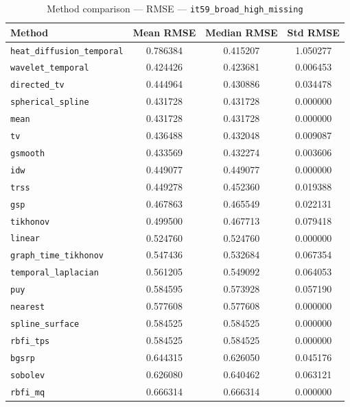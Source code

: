 \begin{table}[ht]
\centering
\caption{Method comparison — RMSE — \texttt{it59_broad_high_missing}}
\label{tab:rmse_it59_broad_high_missing}
\begin{tabular}{lccc}
\hline
Method & Mean RMSE & Median RMSE & Std RMSE \\
\hline
\texttt{heat_diffusion_temporal} & 0.786384 & 0.415207 & 1.050277 \\
\texttt{wavelet_temporal} & 0.424426 & 0.423681 & 0.006453 \\
\texttt{directed_tv} & 0.444964 & 0.430886 & 0.034478 \\
\texttt{spherical_spline} & 0.431728 & 0.431728 & 0.000000 \\
\texttt{mean} & 0.431728 & 0.431728 & 0.000000 \\
\texttt{tv} & 0.436488 & 0.432048 & 0.009087 \\
\texttt{gsmooth} & 0.433569 & 0.432274 & 0.003606 \\
\texttt{idw} & 0.449077 & 0.449077 & 0.000000 \\
\texttt{trss} & 0.449278 & 0.452360 & 0.019388 \\
\texttt{gsp} & 0.467863 & 0.465549 & 0.022131 \\
\texttt{tikhonov} & 0.499500 & 0.467713 & 0.079418 \\
\texttt{linear} & 0.524760 & 0.524760 & 0.000000 \\
\texttt{graph_time_tikhonov} & 0.547436 & 0.532684 & 0.067354 \\
\texttt{temporal_laplacian} & 0.561205 & 0.549092 & 0.064053 \\
\texttt{puy} & 0.584595 & 0.573928 & 0.057190 \\
\texttt{nearest} & 0.577608 & 0.577608 & 0.000000 \\
\texttt{spline_surface} & 0.584525 & 0.584525 & 0.000000 \\
\texttt{rbfi_tps} & 0.584525 & 0.584525 & 0.000000 \\
\texttt{bgsrp} & 0.644315 & 0.626050 & 0.045176 \\
\texttt{sobolev} & 0.626080 & 0.640462 & 0.063121 \\
\texttt{rbfi_mq} & 0.666314 & 0.666314 & 0.000000 \\
\hline
\end{tabular}
\end{table}
